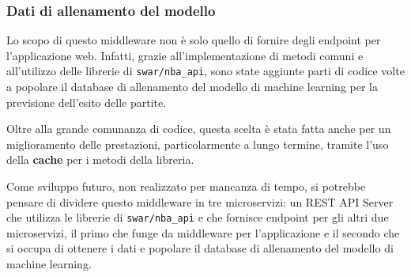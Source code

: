 \subsubsection{Dati di allenamento del modello}
Lo scopo di questo middleware non è solo quello di fornire degli endpoint per l'applicazione web. Infatti, grazie all'implementazione di metodi comuni e all'utilizzo delle librerie di \texttt{swar/nba\_api}, sono state aggiunte parti di codice volte a popolare il database di allenamento del modello di machine learning per la previsione dell'esito delle partite.

Oltre alla grande comunanza di codice, questa scelta è stata fatta anche per un miglioramento delle prestazioni, particolarmente a lungo termine, tramite l'uso della \textbf{cache} per i metodi della libreria.

Come sviluppo futuro, non realizzato per mancanza di tempo, si potrebbe pensare di dividere questo middleware in tre microservizi: un REST API Server che utilizza le librerie di \texttt{swar/nba\_api} e che fornisce endpoint per gli altri due microservizi, il primo che funge da middleware per l'applicazione e il secondo che si occupa di ottenere i dati e popolare il database di allenamento del modello di machine learning.